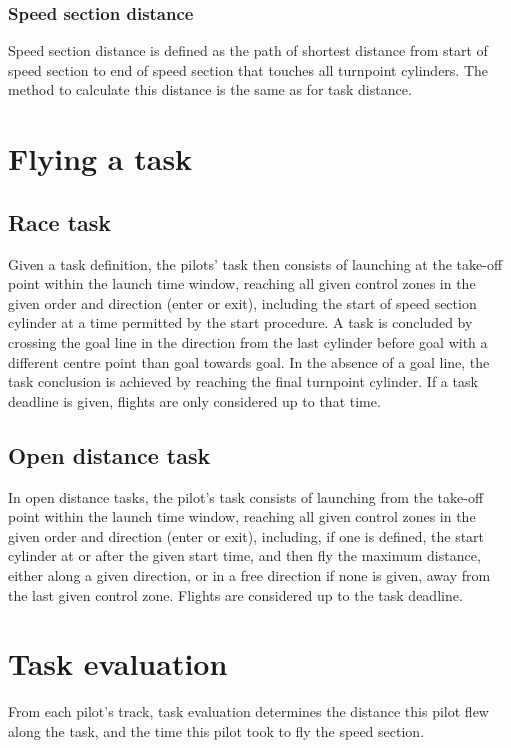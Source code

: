 \documentclass{article}
\begin{document}
\subsubsection{Speed section distance}
Speed section distance is defined as the path of shortest distance from start
of speed section to end of speed section that touches all turnpoint cylinders.
The method to calculate this distance is the same as for task distance.

\newpage
\section{Flying a task}
\label{sec:flying-a-task}
\subsection{Race task}
Given a task definition, the pilots’ task then consists of launching at the
take-off point within the launch time window, reaching all given control zones
in the given order and direction (enter or exit), including the start of speed
section cylinder at a time permitted by the start procedure. A task is
concluded by crossing the goal line in the direction from the last cylinder
before goal with a different centre point than goal towards goal. In the
absence of a goal line, the task conclusion is achieved by reaching the final
turnpoint cylinder. If a task deadline is given, flights are only considered up
to that time.

\subsection{Open distance task}
In open distance tasks, the pilot’s task consists of launching from the
take-off point within the launch time window, reaching all given control zones
in the given order and direction (enter or exit), including, if one is defined,
the start cylinder at or after the given start time, and then fly the maximum
distance, either along a given direction, or in a free direction if none is
given, away from the last given control zone. Flights are considered up to the
task deadline.

\newpage
\section{Task evaluation}
\label{sec:task-evaluation}
From each pilot’s track, task evaluation determines the distance this pilot
flew along the task, and the time this pilot took to fly the speed section.
\end{document}
